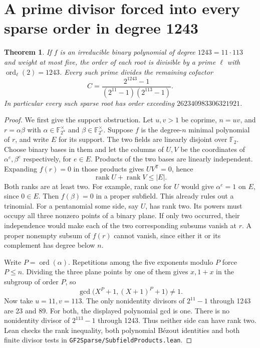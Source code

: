 \documentclass[11pt]{article}
\newtheorem{theorem}{Theorem}
\newcommand{\F}{\mathbb F_2}
\newcommand{\ord}{\operatorname{ord}}
\begin{document}
\section{A prime divisor forced into every sparse order in degree 1243}
\begin{theorem}\label{thm:1243-subfield-product}
If \(f\) is an irreducible binary polynomial of degree \(1243=11\cdot113\)
and weight at most five, the order of each root is divisible by a prime
\(\ell\) with \(\ord_\ell(2)=1243\). Every such prime divides the
remaining cofactor
\[
 C=\frac{2^{1243}-1}{(2^{11}-1)(2^{113}-1)}.
\]
In particular every such sparse root has order exceeding
\(262340983306321921\).
\end{theorem}
\begin{proof}
We first give the support obstruction. Let \(u,v>1\) be coprime,
\(n=uv\), and \(r=\alpha\beta\) with
\(\alpha\in\mathbb F_{2^u}^{\times}\) and
\(\beta\in\mathbb F_{2^v}^{\times}\). Suppose \(f\) is the degree-\(n\)
minimal polynomial of \(r\), and write \(E\) for its support.
The two fields are linearly disjoint over \(\F\). Choose binary bases
in them and let the columns of \(U,V\) be the coordinates of
\(\alpha^e,\beta^e\) respectively, for \(e\in E\).
Products of the two bases are linearly independent. Expanding
\(f(r)=0\) in those products gives \(UV^{\mathsf T}=0\), hence
\[
                    \operatorname{rank} U+\operatorname{rank} V\le |E|.
\]
Both ranks are at least two. For example, rank one for \(U\) would
give \(\alpha^e=1\) on \(E\), since \(0\in E\). Then \(f(\beta)=0\)
in a proper subfield. This already rules out a trinomial.
For a pentanomial some side, say \(U\), has rank two. Its powers
must occupy all three nonzero points of a binary plane. If only two
occurred, their independence would make each of the two corresponding
subsums vanish at \(r\). A proper nonempty subsum of \(f(r)\) cannot
vanish, since either it or its complement has degree below \(n\).

Write \(P=\ord(\alpha)\). Repetitions among the five exponents modulo
\(P\) force \(P\le n\). Dividing the three plane points by one of them
gives \(x,1+x\) in the subgroup of order \(P\), so
\[
       \gcd\bigl(X^P+1,(X+1)^P+1\bigr)\ne1.
\]
Now take \(u=11,v=113\). The only nonidentity divisors of \(2^{11}-1\)
through 1243 are 23 and 89. For both, the displayed polynomial gcd is
one. There is no nonidentity divisor of \(2^{113}-1\) through 1243.
Thus neither side can have rank two. Lean checks the rank inequality,
both polynomial B\'ezout identities and both finite divisor tests in
\nolinkurl{GF2Sparse/SubfieldProducts.lean}.


\end{proof}
\end{document}
